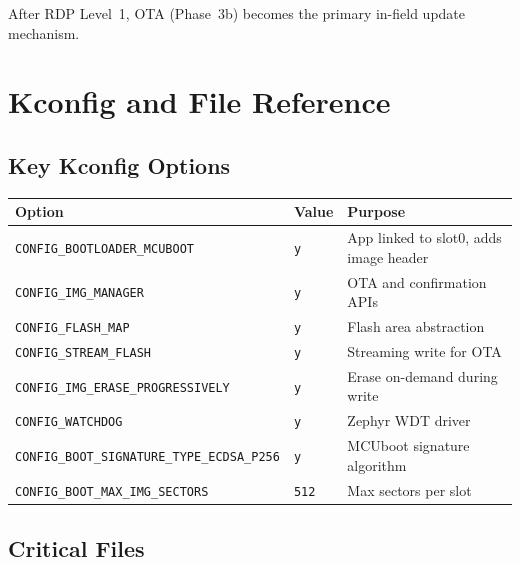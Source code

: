 \documentclass[11pt,a4paper]{article}
\begin{document}
After RDP Level~1, OTA (Phase~3b) becomes the primary in-field update mechanism.

\section{Kconfig and File Reference}

\subsection{Key Kconfig Options}

\begin{center}
\begin{tabular}{@{}lll@{}}
\toprule
\textbf{Option} & \textbf{Value} & \textbf{Purpose} \\
\midrule
\texttt{CONFIG\_BOOTLOADER\_MCUBOOT}         & \texttt{y}   & App linked to slot0, adds image header \\
\texttt{CONFIG\_IMG\_MANAGER}                & \texttt{y}   & OTA and confirmation APIs \\
\texttt{CONFIG\_FLASH\_MAP}                  & \texttt{y}   & Flash area abstraction \\
\texttt{CONFIG\_STREAM\_FLASH}               & \texttt{y}   & Streaming write for OTA \\
\texttt{CONFIG\_IMG\_ERASE\_PROGRESSIVELY}   & \texttt{y}   & Erase on-demand during write \\
\texttt{CONFIG\_WATCHDOG}                    & \texttt{y}   & Zephyr WDT driver \\
\texttt{CONFIG\_BOOT\_SIGNATURE\_TYPE\_ECDSA\_P256} & \texttt{y} & MCUboot signature algorithm \\
\texttt{CONFIG\_BOOT\_MAX\_IMG\_SECTORS}     & \texttt{512} & Max sectors per slot \\
\bottomrule
\end{tabular}
\end{center}

\subsection{Critical Files}
\end{document}
